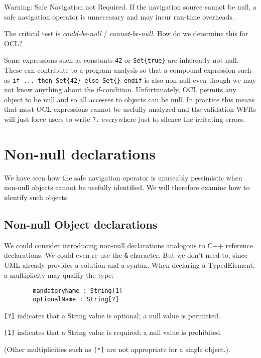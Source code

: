 \documentclass{llncs}
\begin{document}
Warning: Safe Navigation not Required. If the navigation source cannot be null, a safe navigation operator is unnecessary and may incur run-time overheads.

The critical test is \emph{could-be-null} / \emph{cannot-be-null}. How do we determine this for OCL?

Some expressions such as constants \verb|42| or \verb|Set{true}| are inherently not null. These can contribute to a program analysis so that a compound expression such as \verb|if ... then Set{42} else Set{} endif| is also non-null even though we may not know anything about the if-condition. Unfortunately, OCL permits any object to be null and so all accesses to objects can be null. In practice this means that most OCL expressions cannot be usefully analyzed and the validation WFRs will just force users to write \verb|?.| everywhere just to silence the irritating errors. 

\section{Non-null declarations}\label{Non-null declarations}

We have seen how the safe navigation operator is unuseably pessimistic when non-null objects cannot be usefully identified. We will therefore examine how to identify such objects. 

\subsection{Non-null Object declarations}

We could consider introducing non-null declarations analogous to C++ reference declarations. We could even re-use the \verb|&| character. But we don't need to, since UML\cite{UML-2.5} already provides a solution and a syntax. When declaring a TypedElement, a multiplicity may qualify the type:

\begin{verbatim}
        mandatoryName : String[1]
        optionalName : String[?]
\end{verbatim}

\verb|[?]| indicates that a String value is optional; a null value is permitted.

\verb|[1]| indicates that a String value is required; a null value is prohibited.

(Other multiplicities such as \verb|[*]| are not appropriate for a single object.).
\end{document}
